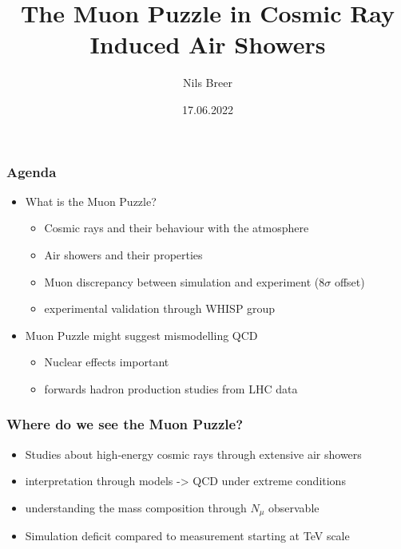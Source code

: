 \documentclass[aspectratio=1610, 9pt]{beamer}
\title{The Muon Puzzle in Cosmic Ray Induced Air Showers}
\author[N.Breer]{Nils Breer}
\institute{Fakultät Physik}
\date{17.06.2022}
\begin{document}
\maketitle

\begin{frame}\frametitle{Agenda}
  \begin{itemize}
    \item What is the Muon Puzzle?
    \begin{itemize}
      \item Cosmic rays and their behaviour with the atmosphere
      \item Air showers and their properties
      \item Muon discrepancy between simulation and experiment (8$\sigma$ offset)
      \item experimental validation through WHISP group
    \end{itemize}
    \item Muon Puzzle might suggest mismodelling QCD
    \begin{itemize}
      \item Nuclear effects important
      \item forwards hadron production studies from LHC data
    \end{itemize}
  \end{itemize}
\end{frame}

\begin{frame}\frametitle{Where do we see the Muon Puzzle?}
  \begin{itemize}
    \item Studies about high-energy cosmic rays through extensive air showers
    \item interpretation through models -> QCD under extreme conditions
    \item understanding the mass composition through $N_\mu$ observable
    \item Simulation deficit compared to measurement starting at TeV scale
  \end{itemize}
\end{frame}
\end{document}
